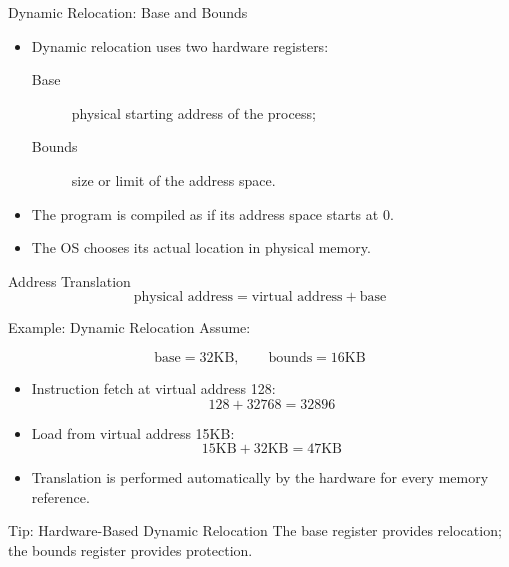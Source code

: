 \begin{frame}{Dynamic Relocation: Base and Bounds}
    \begin{itemize}
        \item Dynamic relocation uses two hardware registers:
        \begin{description}
            \item[Base] physical starting address of the process;
            \item[Bounds] size or limit of the address space.
        \end{description}

        \item The program is compiled as if its address space starts at 0.
        \item The OS chooses its actual location in physical memory.
    \end{itemize}

    \begin{block}{Address Translation}
        \[
            \text{physical address}
            =
            \text{virtual address}
            +
            \text{base}
        \]
    \end{block}
\end{frame}


\begin{frame}{Example: Dynamic Relocation}
    Assume:

    \[
        \text{base} = 32\text{KB},
        \qquad
        \text{bounds} = 16\text{KB}
    \]

    \begin{itemize}
        \item Instruction fetch at virtual address 128:
        \[
            128 + 32768 = 32896
        \]

        \item Load from virtual address 15KB:
        \[
            15\text{KB} + 32\text{KB} = 47\text{KB}
        \]

        \item Translation is performed automatically by the hardware
              for every memory reference.
    \end{itemize}

    \begin{block}{Tip: Hardware-Based Dynamic Relocation}
        The base register provides relocation; the bounds register
        provides protection.
    \end{block}
\end{frame}


